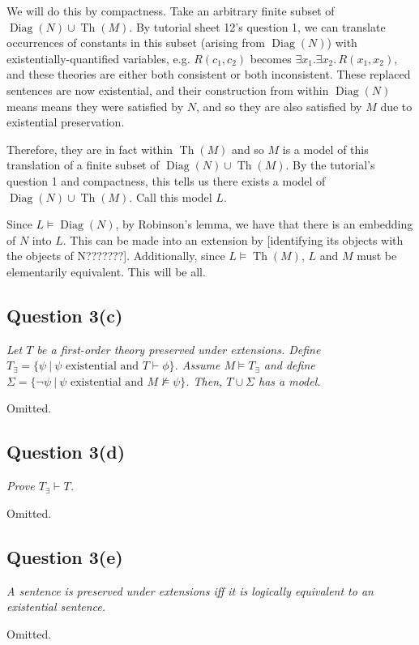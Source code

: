 \documentclass[a4paper]{article}
\DeclareMathOperator{\Diag}{Diag}
\DeclareMathOperator{\Th}{Th}
\begin{document}
We will do this by compactness.
Take an arbitrary finite subset of $\Diag(N) \cup \Th(M)$.
By tutorial sheet 12's question 1, we can translate occurrences
of constants in this subset (arising from $\Diag(N)$)
with existentially-quantified variables,
e.g. $R(c_1,c_2)$ becomes $\exists x_1.\exists x_2.\, R(x_1, x_2)$,
and these theories are either both consistent or both inconsistent.
These replaced sentences are now existential,
and their construction from within $\Diag(N)$ means
means they were satisfied by $N$, and so they are also satisfied by $M$
due to existential preservation.

Therefore, they are in fact within $\Th(M)$ and so $M$
is a model of this translation of a finite subset of $\Diag(N) \cup \Th(M)$.
By the tutorial's question 1 and compactness,
this tells us there exists a model of $\Diag(N) \cup \Th(M)$.
Call this model $L$. 

Since $L \models \Diag(N)$, by Robinson's lemma,
we have that there is an embedding of $N$ into $L$.
This can be made into an extension by [identifying its objects with the objects of N???????].
Additionally,
since $L \models \Th(M)$, $L$ and $M$ must be elementarily equivalent.
This will be all.




\subsection*{Question 3(c)}
\begin{center}
  \textit{Let $T$ be a first-order theory preserved under extensions. Define
    $T_\exists = \{\psi ~|~ \psi\text{ existential and } T \vdash \phi\}$.
    Assume $M \models T_\exists$ and define $\Sigma = \{ \neg \psi ~|~ \psi\text{ existential and }M \nvDash \psi\}$. Then, $T \cup \Sigma$ has a model.
  }
\end{center}
Omitted.
\subsection*{Question 3(d)}
\begin{center}
  \textit{Prove $T_\exists \vdash T$.}
\end{center}
Omitted.
\subsection*{Question 3(e)}
\begin{center}
  \textit{A sentence is preserved under extensions iff
  it is logically equivalent to an existential sentence.}
\end{center}
Omitted.
\end{document}
